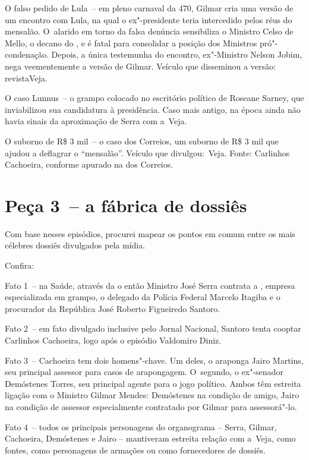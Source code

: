 O falso pedido de Lula~-- em pleno carnaval da  470, Gilmar cria uma
versão de um encontro com Lula, na qual o ex"-presidente teria
intercedido pelos réus do mensalão. O~alarido em torno da falsa denúncia
sensibiliza o Ministro Celso de Mello, o decano do , e é fatal para
consolidar a posição dos Ministros pró"-condenação. Depois, a única
testemunha do encontro, ex"-Ministro Nelson Jobim, nega veementemente a
versão de Gilmar. Veículo que disseminou a versão: revistaVeja.

O caso Lunnus~-- o grampo colocado no escritório político de Roseane
Sarney, que inviabilizou sua candidatura à presidência. Caso mais
antigo, na época ainda não havia sinais da aproximação de Serra com
a~Veja.

O suborno de R\$ 3 mil~-- o caso dos Correios, um suborno de R\$ 3 mil
que ajudou a deflagrar o ``mensalão''. Veículo que divulgou:~Veja.
Fonte: Carlinhos Cachoeira, conforme apurado na  dos Correios.

\section{Peça 3~-- a fábrica de dossiês}

Com base nesses episódios, procurei mapear os pontos em comum entre os
mais célebres dossiês divulgados pela mídia.

Confira:

Fato 1~-- na Saúde, através da  o então Ministro José Serra
contrata a , empresa especializada em grampo, o delegado da Polícia
Federal Marcelo Itagiba e o procurador da República José Roberto
Figueiredo Santoro.

Fato 2~-- em fato divulgado inclusive pelo Jornal Nacional, Santoro
tenta cooptar Carlinhos Cachoeira, logo após o episódio Valdomiro Diniz.

Fato 3~-- Cachoeira tem dois homens"-chave. Um deles, o araponga Jairo
Martins, seu principal assessor para casos de arapongagem. O~segundo, o
ex"-senador Demóstenes Torres, seu principal agente para o jogo político.
Ambos têm estreita ligação com o Ministro Gilmar Mendes: Demóstenes na
condição de amigo, Jairo na condição de assessor especialmente
contratado por Gilmar para assessorá"-lo.

Fato 4~-- todos os principais personagens do organograma -- Serra,
Gilmar, Cachoeira, Demóstenes e Jairo -- mantiveram estreita relação com
a~Veja, como fontes, como personagens de armações ou como fornecedores
de dossiês.

